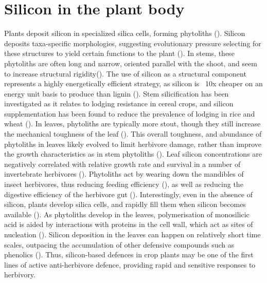 \documentclass[12pt, letterpaper, ]{report}
\begin{document}
\section{Silicon in the plant body}	

Plants deposit silicon in specialized silica cells, forming phytoliths (\cite{waterman_short-term_2021}). Silicon deposits taxa-specific morphologies, suggesting evolutionary pressure selecting for these structures to yield certain functions to the plant (\cite{piperno_phytoliths_2006}). In stems, these phytoliths are often long and narrow, oriented parallel with the shoot, and seem to increase structural rigidity(\cite{stromberg_functions_2016}). The use of silicon as a structural component represents a highly energetically efficient strategy, as silicon is ~10x cheaper on an energy unit basis to produce than lignin (\cite{stromberg_functions_2016}). Stem silicification has been investigated as it relates to lodging resistance in cereal crops, and silicon supplementation has been found to reduce the prevalence of lodging in rice and wheat (\cite{dorairaj_influence_2017,muszynska_mechanistic_2021}). In leaves, phytoliths are typically more stout, though they still increase the mechanical toughness of the leaf (\cite{simpson_still_2017}). This overall toughness, and abundance of phytoliths in leaves likely evolved to limit herbivore damage, rather than improve the growth characteristics as in stem phytoliths (\cite{stromberg_functions_2016}). Leaf silicon concentrations are negatively correlated with relative growth rate and survival in a number of invertebrate herbivores (\cite{juma_influence_2015,massey_silica_2006,mir_silicon_2019}). Phytoliths act by wearing down the mandibles of insect herbivores, thus reducing feeding efficiency (\cite{waterman_short-term_2021-1,mir_silicon_2019}), as well as reducing the digestive efficiency of the herbivore gut (\cite{hunt_novel_2008}). Interestingly, even in the absence of silicon, plants develop silica cells, and rapidly fill them when silicon becomes available (\cite{waterman_short-term_2021-1}). As phytoliths develop in the leaves, polymerisation of monosilicic acid is aided by interactions with proteins in the cell wall, which act as sites of nucleation (\cite{nawaz_phytolith_2019}). Silicon deposition in the leaves can happen on relatively short time scales, outpacing the accumulation of other defensive compounds such as phenolics (\cite{waterman_short-term_2021}). Thus, silicon-based defences in crop plants may be one of the first lines of active anti-herbivore defence, providing rapid and sensitive responses to herbivory. 
\end{document}
